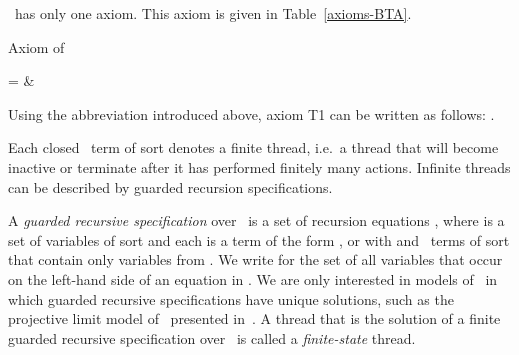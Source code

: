 \documentclass[fleqn]{llncs}
\begin{document}
\BTA\ has only one axiom.
This axiom is given in Table~\ref{axioms-BTA}.\begin{table}[!t]
\caption{Axiom of \BTA}
\label{axioms-BTA}
\begin{eqntbl}
\begin{axcol}
 =                       & 
\end{axcol}
\end{eqntbl}
\end{table}
Using the abbreviation introduced above, axiom T1 can be written as
follows: .

Each closed \BTA\ term of sort  denotes a finite thread, i.e.\ a
thread that will become inactive or terminate after it has performed
finitely many actions.
Infinite threads can be described by guarded recursion specifications.

A \emph{guarded recursive specification} over \BTA\ is a set of
recursion equations , where  is a
set of variables of sort  and each  is a term of the form
,  or  with  and  \BTA\ terms
of sort  that contain only variables from .
We write  for the set of all variables that occur on the
left-hand side of an equation in .
We are only interested in models of \BTA\ in which guarded recursive
specifications have unique solutions, such as the projective limit model
of \BTA\ presented in~\cite{BB03a}.
A thread that is the solution of a finite guarded recursive
specification over \BTA\ is called a \emph{finite-state} thread.
\end{document}
